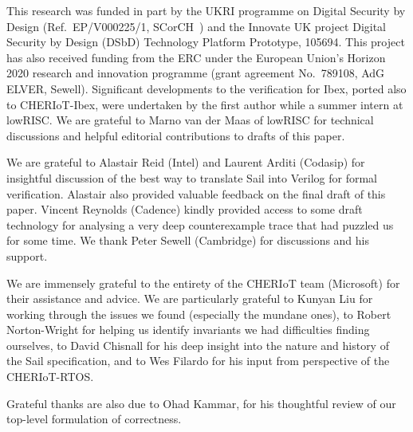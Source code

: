 \documentclass[10pt,conference]{IEEEtran}
\begin{document}
This research was funded in part by the UKRI programme on Digital Security
by Design (Ref.~EP/V000225/1, SCorCH~\cite{SCorCH}) and the Innovate UK
project Digital Security by Design (DSbD) Technology Platform Prototype,
105694.  This project has also received funding from the ERC under the
European Union's Horizon 2020 research and innovation programme (grant
agreement No.\ 789108, AdG ELVER, Sewell). Significant developments to the
verification for Ibex, ported also to CHERIoT-Ibex, were undertaken by the
first author while a summer intern at lowRISC. We are grateful to Marno van
der Maas of lowRISC for technical discussions and helpful editorial
contributions to drafts of this paper.

We are grateful to Alastair Reid (Intel) and Laurent Arditi (Codasip) for
insightful discussion of the best way to translate Sail into Verilog for
formal verification. Alastair also provided valuable feedback on the
final draft of this paper. Vincent Reynolds (Cadence) kindly provided
access to some draft technology for analysing a very deep counterexample
trace that had puzzled us for some time. We thank Peter Sewell (Cambridge)
for discussions and his support.

We are immensely grateful to the entirety of the CHERIoT team (Microsoft)
for their assistance and advice. We are particularly grateful to Kunyan Liu
for working through the issues we found (especially the mundane ones), to
Robert Norton-Wright for helping us identify invariants we had difficulties
finding ourselves, to David Chisnall for his deep insight into the nature
and history of the Sail specification, and to Wes Filardo for his input
from perspective of the CHERIoT-RTOS.

Grateful thanks are also due to Ohad Kammar, for his thoughtful review of
our top-level formulation of correctness. 




\end{document}
